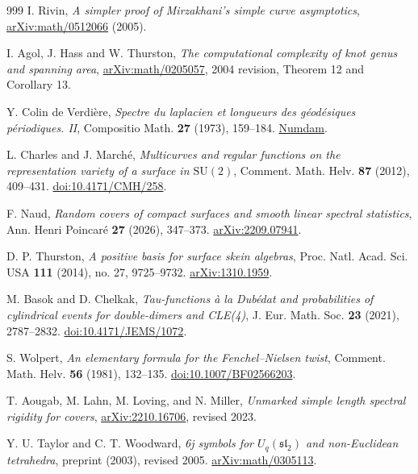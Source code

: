 \documentclass[11pt,a4paper]{article}
\numberwithin{equation}{section}
\theoremstyle{definition}
\theoremstyle{remark}
\begin{document}
\begin{thebibliography}{999}
I. Rivin,
\emph{A simpler proof of Mirzakhani's simple curve asymptotics},
\href{https://arxiv.org/abs/math/0512066}{arXiv:math/0512066} (2005).

I. Agol, J. Hass and W. Thurston,
\emph{The computational complexity of knot genus and spanning area},
\href{https://arxiv.org/abs/math/0205057}{arXiv:math/0205057},
2004 revision, Theorem 12 and Corollary 13.

Y. Colin de Verdi\`ere,
\emph{Spectre du laplacien et longueurs des g\'eod\'esiques p\'eriodiques. II},
Compositio Math. \textbf{27} (1973), 159--184.
\href{https://www.numdam.org/item/CM_1973__27_2_159_0/}{Numdam}.

L. Charles and J. March\'e,
\emph{Multicurves and regular functions on the representation variety
of a surface in $\mathrm{SU}(2)$},
Comment. Math. Helv. \textbf{87} (2012), 409--431.
\href{https://doi.org/10.4171/CMH/258}{doi:10.4171/CMH/258}.

F. Naud,
\emph{Random covers of compact surfaces and smooth linear spectral statistics},
Ann. Henri Poincar\'e \textbf{27} (2026), 347--373.
\href{https://arxiv.org/abs/2209.07941}{arXiv:2209.07941}.

D. P. Thurston,
\emph{A positive basis for surface skein algebras},
Proc. Natl. Acad. Sci. USA \textbf{111} (2014), no. 27, 9725--9732.
\href{https://arxiv.org/abs/1310.1959}{arXiv:1310.1959}.

M. Basok and D. Chelkak,
\emph{Tau-functions \`a la Dub\'edat and probabilities of cylindrical
events for double-dimers and CLE(4)},
J. Eur. Math. Soc. \textbf{23} (2021), 2787--2832.
\href{https://doi.org/10.4171/JEMS/1072}{doi:10.4171/JEMS/1072}.

S. Wolpert,
\emph{An elementary formula for the Fenchel--Nielsen twist},
Comment. Math. Helv. \textbf{56} (1981), 132--135.
\href{https://doi.org/10.1007/BF02566203}{doi:10.1007/BF02566203}.

T. Aougab, M. Lahn, M. Loving, and N. Miller,
\emph{Unmarked simple length spectral rigidity for covers},
\href{https://arxiv.org/abs/2210.16706}{arXiv:2210.16706}, revised 2023.

Y. U. Taylor and C. T. Woodward,
\emph{6j symbols for $U_q(\mathfrak{sl}_2)$ and non-Euclidean tetrahedra},
preprint (2003), revised 2005.
\href{https://arxiv.org/abs/math/0305113}{arXiv:math/0305113}.


\end{thebibliography}
\end{document}
